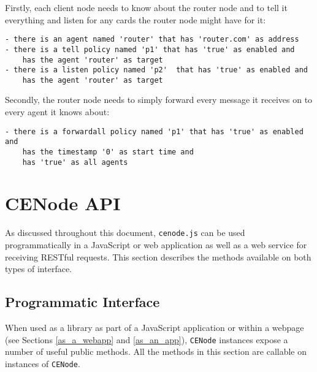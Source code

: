 \documentclass{scrartcl}
\begin{document}
Firstly, each client node needs to know about the router node and to tell it everything and listen for any cards the router node might have for it:\\
\begin{verbatim}
- there is an agent named 'router' that has 'router.com' as address
- there is a tell policy named 'p1' that has 'true' as enabled and 
    has the agent 'router' as target
- there is a listen policy named 'p2'  that has 'true' as enabled and
    has the agent 'router' as target
\end{verbatim}

Secondly, the router node needs to simply forward every message it receives on to every agent it knows about:\\
\begin{verbatim}
- there is a forwardall policy named 'p1' that has 'true' as enabled and
    has the timestamp '0' as start time and 
    has 'true' as all agents
\end{verbatim}


\section{CENode API}
\label{api}
As discussed throughout this document, \texttt{cenode.js} can be used programmatically in a JavaScript or web application as well as a web service for receiving RESTful requests. This section describes the methods available on both types of interface.

\subsection{Programmatic Interface}
When used as a library as part of a JavaScript application or within a webpage (see Sections \ref{as_a_webapp} and \ref{as_an_app}), \texttt{CENode} instances expose a number of useful public methods. All the methods in this section are callable on instances of \texttt{CENode}.

\newcommand{\cenodemethod}[5]{
    \begin{flushleft}
    \begin{minipage}{1.2\textwidth}
    \vskip10pt
    \begin{large}
        \noindent\texttt{#1 \underline{#2} (#3)}
    \end{large}
    \vskip5pt
    \begin{tabular}{|p{0.9\textwidth}}
        \textit{#4}
        \vskip8pt
        \textbf{Example Usage}\\
        #5
    \end{tabular}
    \end{minipage}
    \end{flushleft}
}
\end{document}
